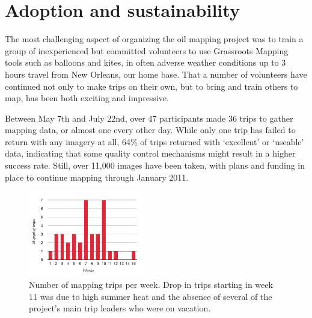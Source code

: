 \documentclass[11pt,oneside,notitlepage]{report}
\begin{document}
\section{Adoption and sustainability}


The most challenging aspect of organizing the oil mapping project was to train a group of inexperienced but committed volunteers to use Grassroots Mapping tools such as balloons and kites, in often adverse weather conditions up to 3 hours travel from New Orleans, our home base. That a number of volunteers have continued not only to make trips on their own, but to bring and train others to map, has been both exciting and impressive.

Between May 7th and July 22nd, over 47 participants made 36 trips to gather mapping data, or almost one every other day. While only one trip has failed to return with any imagery at all, 64\% of trips returned with `excellent' or `useable' data, indicating that some quality control mechanisms might result in a higher success rate. Still, over 11,000 images have been taken, with plans and funding in place to continue mapping through January 2011. 

\begin{figure}
	\begin{flushright}
		\includegraphics[width=0.45\textwidth]{diagrams/mapping-trips.pdf}
		\caption{Number of mapping trips per week. Drop in trips starting in week 11 was due to high summer heat and the absence of several of the project's main trip leaders who were on vacation.}
	\end{flushright}
\end{figure}
\end{document}
